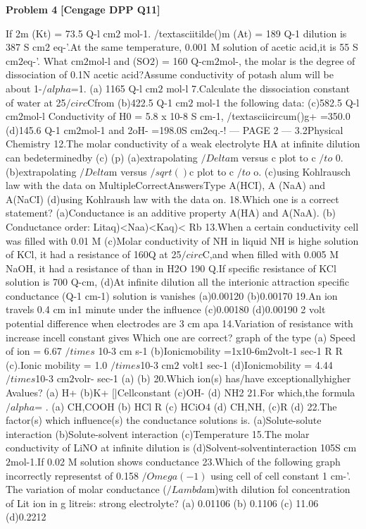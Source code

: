 \begin{problembox}
\textbf{Problem 4} \hfill \textbf{[Cengage DPP Q11]}
\label{q:ext-cng_dpp_all_questions-4}

If 2m (Kt) = 73.5 Q-l cm$2$ mol-1. /textasciitilde()m (At) = 189 Q-1
dilution is 387 S cm$2$ eq-'.At the same temperature,
0.001 M solution of acetic acid,it is 55 S cm$2$eq-'. What
cm$2$mol-l and (SO$2$) = 160 Q-cm$2$mol-, the molar
is the degree of dissociation of 0.1N acetic acid?Assume
conductivity of potash alum will be about
1-$/alpha$=1.
(a) 1165 Q-l cm$2$ mol-l
7.Calculate the dissociation constant of water at 25$/circ$Cfrom
(b)422.5 Q-1 cm$2$ mol-1
the following data:
(c)582.5 Q-l cm$2$mol-l
Conductivity of H0 = 5.8 x 10-8 S cm-1, /textasciicircum()g+ =350.0
(d)145.6 Q-1 cm$2$mol-1
and 2oH- =198.0S cm2eq.-!
--- PAGE 2 ---
3.2Physical Chemistry
12.The molar conductivity of a weak electrolyte HA at infinite
dilution can bedeterminedby
(c)
(p)
(a)extrapolating $/Delta$m versus c plot to c $/to$ 0.
(b)extrapolating $/Delta$m versus $/sqrt()$c plot to c $/to$ o.
(c)using Kohlrausch law with the data on
MultipleCorrectAnswersType
A(HCI), A (NaA) and A(NaCI)
(d)using Kohlraush law with the data on.
18.Which one is a correct statement?
(a)Conductance is an additive property
A(HA) and A(NaA).
(b) Conductance order: Litaq)<Naa)<Kaq)< Rb
13.When a certain conductivity cell was filled with 0.01 M
(c)Molar conductivity of NH in liquid NH is highe
solution of KCl, it had a resistance of 160Q at 25$/circ$C,and
when filled with 0.005 M NaOH, it had a resistance of
than in H2O
190 Q.If specific resistance of KCl solution is 700 Q-cm,
(d)At infinite dilution all the interionic attraction
specific conductance (Q-1 cm-1) solution is
vanishes
(a)0.00120
(b)0.00170
19.An ion travels 0.4 cm in1 minute under the influence
(c)0.00180
(d)0.00190
2 volt potential difference when electrodes are 3 cm apa
14.Variation of resistance with increase incell constant gives
Which one are correct?
graph of the type
(a) Speed of ion = 6.67 $/times$ 10-3 cm s-1
(b)Ionicmobility =1x10-6m$2$volt-1 sec-1
R
R
(c).Ionic mobility = 1.0 $/times$10-3 cm$2$ volt1 sec-1
(d)Ionicmobility = 4.44 $/times$10-3 cm$2$volr-  sec-1
(a)
(b)
20.Which ion(s) has/have exceptionallyhigher Avalues?
(a) H+
(b)K+
[|Cellconstant
(c)OH-
(d) NH2
21.For which,the formula $/alpha$=
 . 
(a) CH,COOH
(b) HCl
R
(c) HCiO4
(d) CH,NH,
(c)R
(d)
22.The factor(s) which influence(s) the conductance
solutions is.
(a)Solute-solute interaction
(b)Solute-solvent interaction
(c)Temperature
15.The molar conductivity of LiNO at infinite dilution is
(d)Solvent-solventinteraction
105S cm$2$mol-1.If 0.02 M solution shows conductance
23.Which of the following graph incorrectly representst
of 0.158 $/Omega(-1)$ using cell of cell constant 1 cm-'. The
variation of molar conductance ($/Lambda$m)with dilution fol
concentration of Lit ion in g litreis:
strong electrolyte?
(a) 0.01106
(b) 0.1106
(c) 11.06
(d)0.2212
\end{problembox}

